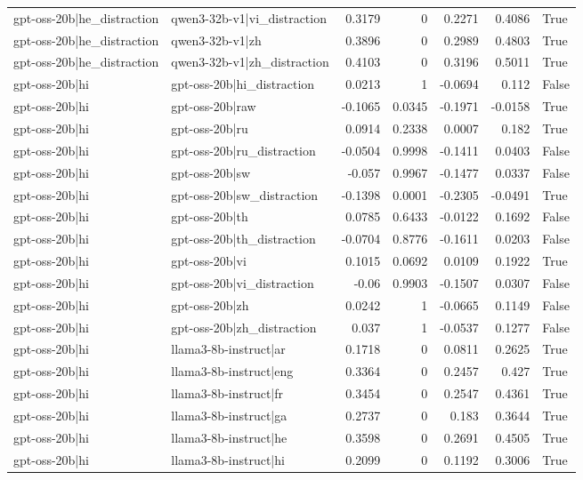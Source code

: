 \begin{table}
\begin{tabular}{l l r r r r l}
gpt-oss-20b|he_distraction & qwen3-32b-v1|vi_distraction & 0.3179 & 0 & 0.2271 & 0.4086 & True \\
gpt-oss-20b|he_distraction & qwen3-32b-v1|zh & 0.3896 & 0 & 0.2989 & 0.4803 & True \\
gpt-oss-20b|he_distraction & qwen3-32b-v1|zh_distraction & 0.4103 & 0 & 0.3196 & 0.5011 & True \\
gpt-oss-20b|hi & gpt-oss-20b|hi_distraction & 0.0213 & 1 & -0.0694 & 0.112 & False \\
gpt-oss-20b|hi & gpt-oss-20b|raw & -0.1065 & 0.0345 & -0.1971 & -0.0158 & True \\
gpt-oss-20b|hi & gpt-oss-20b|ru & 0.0914 & 0.2338 & 0.0007 & 0.182 & True \\
gpt-oss-20b|hi & gpt-oss-20b|ru_distraction & -0.0504 & 0.9998 & -0.1411 & 0.0403 & False \\
gpt-oss-20b|hi & gpt-oss-20b|sw & -0.057 & 0.9967 & -0.1477 & 0.0337 & False \\
gpt-oss-20b|hi & gpt-oss-20b|sw_distraction & -0.1398 & 0.0001 & -0.2305 & -0.0491 & True \\
gpt-oss-20b|hi & gpt-oss-20b|th & 0.0785 & 0.6433 & -0.0122 & 0.1692 & False \\
gpt-oss-20b|hi & gpt-oss-20b|th_distraction & -0.0704 & 0.8776 & -0.1611 & 0.0203 & False \\
gpt-oss-20b|hi & gpt-oss-20b|vi & 0.1015 & 0.0692 & 0.0109 & 0.1922 & True \\
gpt-oss-20b|hi & gpt-oss-20b|vi_distraction & -0.06 & 0.9903 & -0.1507 & 0.0307 & False \\
gpt-oss-20b|hi & gpt-oss-20b|zh & 0.0242 & 1 & -0.0665 & 0.1149 & False \\
gpt-oss-20b|hi & gpt-oss-20b|zh_distraction & 0.037 & 1 & -0.0537 & 0.1277 & False \\
gpt-oss-20b|hi & llama3-8b-instruct|ar & 0.1718 & 0 & 0.0811 & 0.2625 & True \\
gpt-oss-20b|hi & llama3-8b-instruct|eng & 0.3364 & 0 & 0.2457 & 0.427 & True \\
gpt-oss-20b|hi & llama3-8b-instruct|fr & 0.3454 & 0 & 0.2547 & 0.4361 & True \\
gpt-oss-20b|hi & llama3-8b-instruct|ga & 0.2737 & 0 & 0.183 & 0.3644 & True \\
gpt-oss-20b|hi & llama3-8b-instruct|he & 0.3598 & 0 & 0.2691 & 0.4505 & True \\
gpt-oss-20b|hi & llama3-8b-instruct|hi & 0.2099 & 0 & 0.1192 & 0.3006 & True \\

\end{tabular}
\end{table}
